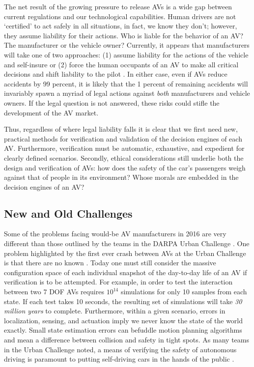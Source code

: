  The net result of the growing pressure to release AVs is a wide gap between current regulations and our technological capabilities. 
 Human drivers are not `certified' to act safely in all situations, in fact, we know they don't; however, they assume liability for their actions.
 Who is liable for the behavior of an AV? The manufacturer or the vehicle owner?
 Currently, it appears that manufacturers will take one of two approaches: (1) assume liability for the actions of the vehicle and self-insure \cite{volvo15Liability} or (2) force the human occupants of an AV to make all critical decisions and shift liability to the pilot \cite{maurer2015autonomes}. In either case, even if AVs reduce accidents by 99 percent, it is likely that the 1 percent of remaining accidents will invariably spawn a myriad of legal actions against \emph{both} manufacturers \cite{russell2015research} and vehicle owners.   
 If the legal question is not answered, these risks could stifle the development of the AV market.
 
 Thus, regardless of where legal liability falls it is clear that we first need new, practical methods for verification and validation of the decision engines of each AV.
 Furthermore, verification must be automatic, exhaustive, and expedient for clearly defined scenarios. 
 Secondly, ethical considerations still underlie both the design and verification of AVs: how does the safety of the car's passengers weigh against that of people in its environment? 
 Whose morals are embedded in the decision engines of an AV?
 
 \subsection{New and Old Challenges}
 
 Some of the problems facing would-be AV manufacturers in 2016 are very different than those outlined by the teams in the DARPA Urban Challenge \cite{buehler2009darpa}. One problem highlighted by the first ever crash between AVs at the Urban Challenge \cite{fletcher2008cornell} is that there are no known  \cite{urmson2008autonomous}.  Today one must still consider the massive configuration space of each individual snapshot of the day-to-day life of an AV if verification is to be attempted. For example, in order to test the interaction between two 7 DOF AVs requires $10^{14}$ simulations for only 10 samples from each state. If each test takes 10 seconds, the resulting set of simulations will take \emph{30 million years} to complete. Furthermore, within a given scenario, errors in localization, sensing, and actuation imply we never know the state of the world exactly. Small state estimation errors can befuddle motion planning algorithms and mean a difference between collision and safety in tight spots. As many teams in the Urban Challenge noted, a means of verifying the safety of autonomous driving is paramount to putting self-driving cars in the hands of the public \cite{urmson2008autonomous}. 
 
